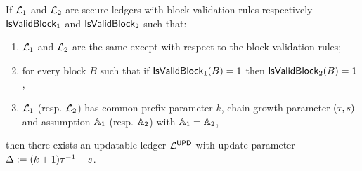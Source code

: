 \begin{theorem}
If $\mathcal{L}_1$ and $\mathcal{L}_2$ are secure ledgers with block validation rules respectively $\mathsf{IsValidBlock}_1$ and $\mathsf{IsValidBlock}_2$ such that: 
\begin{enumerate}
	\item  $\mathcal{L}_1$ and $\mathcal{L}_2$ are the same except with respect to the block validation rules;
	\item for every block $B$ such that if $\mathsf{IsValidBlock}_1(B)=1$ then $\mathsf{IsValidBlock}_2(B)=1$,
	\item $\mathcal{L}_1$ (resp. $\mathcal{L}_2$)  has common-prefix parameter $k$, chain-growth parameter  $(\tau, s)$ and assumption $\mathbb{A}_1$ (resp. $\mathbb{A}_2$) with $\mathbb{A}_1=\mathbb{A}_2$,
	
\end{enumerate}
then there exists an updatable ledger $\mathcal{L}^\mathsf{UPD}$ with update parameter  $\Delta := (k+1) \tau^{-1} + s$.
\end{theorem}




